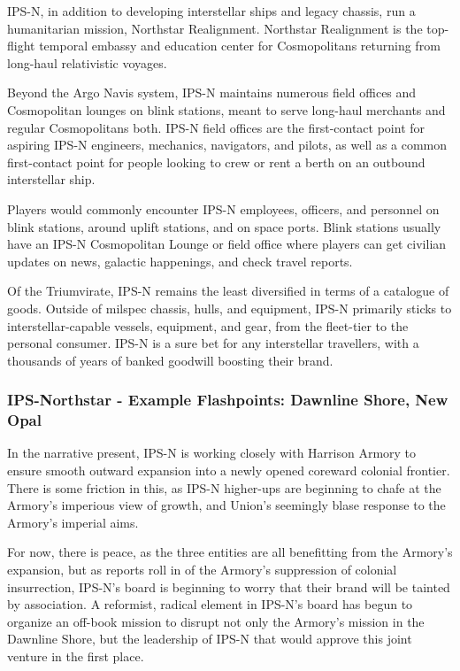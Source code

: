 IPS-N, in addition to developing interstellar ships and legacy chassis, run a humanitarian
mission, Northstar Realignment. Northstar Realignment is the top-flight temporal embassy and
education center for Cosmopolitans returning from long-haul relativistic voyages.

Beyond the Argo Navis system, IPS-N maintains numerous field offices and Cosmopolitan
lounges on blink stations, meant to serve long-haul merchants and regular Cosmopolitans both.
IPS-N field offices are the first-contact point for aspiring IPS-N engineers, mechanics,
navigators, and pilots, as well as a common first-contact point for people looking to crew or rent
a berth on an outbound interstellar ship.

Players would commonly encounter IPS-N employees, officers, and personnel on blink stations,
around uplift stations, and on space ports. Blink stations usually have an IPS-N Cosmopolitan
Lounge or field office where players can get civilian updates on news, galactic happenings, and
check travel reports.

Of the Triumvirate, IPS-N remains the least diversified in terms of a catalogue of goods. Outside
of milspec chassis, hulls, and equipment, IPS-N primarily sticks to interstellar-capable vessels,
equipment, and gear, from the fleet-tier to the personal consumer. IPS-N is a sure bet for any
interstellar travellers, with a thousands of years of banked goodwill boosting their brand.

\subsubsection[Example Flashpoints: Dawnline Shore, New Opal]{IPS-Northstar - Example Flashpoints: Dawnline Shore, New Opal}

In the narrative present, IPS-N is working closely with Harrison Armory to ensure smooth
outward expansion into a newly opened coreward colonial frontier. There is some friction in this,
as IPS-N higher-ups are beginning to chafe at the Armory's imperious view of growth, and
Union's seemingly blase response to the Armory's imperial aims.

For now, there is peace, as the three entities are all benefitting from the Armory's expansion, but
as reports roll in of the Armory's suppression of colonial insurrection, IPS-N's board is beginning
to worry that their brand will be tainted by association. A reformist, radical element in IPS-N's
board has begun to organize an off-book mission to disrupt not only the Armory's mission in the
Dawnline Shore, but the leadership of IPS-N that would approve this joint venture in the first
place.

